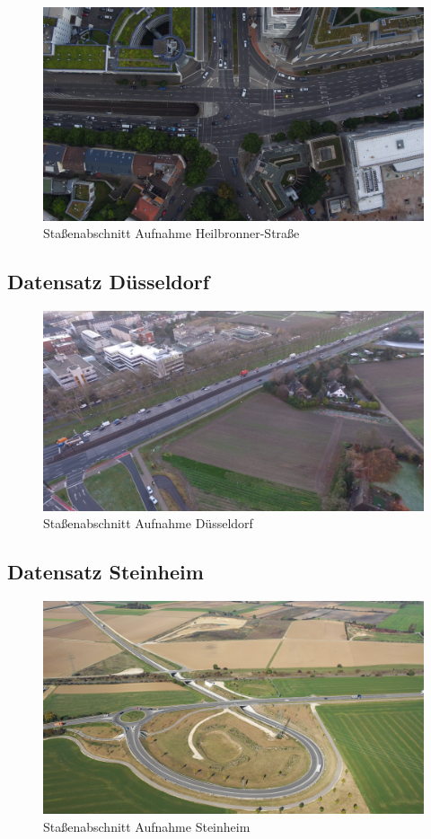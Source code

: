 \begin{figure}[H]
\centering
    \includegraphics[width=0.6\linewidth]{resources/img/Anhang/Heilbronner}
\caption[]{Staßenabschnitt Aufnahme Heilbronner-Straße}
\label{fig:anhang_ds_heilbronner}
\end{figure}

\subsection*{Datensatz Düsseldorf}

\begin{figure}[H]
\centering
    \includegraphics[width=0.6\linewidth]{resources/img/Anhang/Duesseldorf}
\caption[]{Staßenabschnitt Aufnahme Düsseldorf}
\label{fig:anhang_ds_duesseldorf}
\end{figure}

\subsection*{Datensatz Steinheim}

\begin{figure}[H]
\centering
    \includegraphics[width=0.6\linewidth]{resources/img/Anhang/Steinheim}
\caption[]{Staßenabschnitt Aufnahme Steinheim}
\label{fig:anhang_ds_steinheim}
\end{figure}